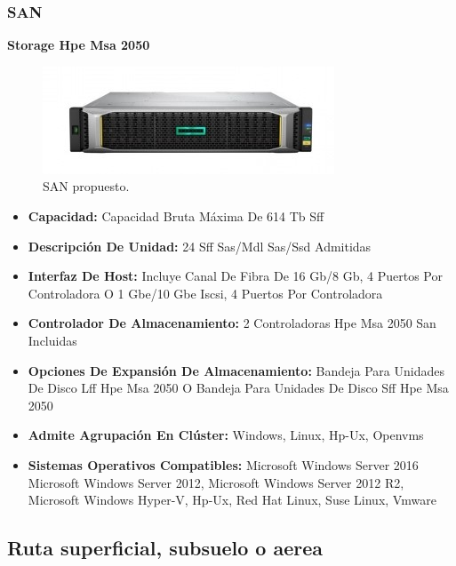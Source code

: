 \documentclass[12pt,letterpaper]{article}
\begin{document}
\newpage
\subsubsection{SAN}
\textbf{Storage Hpe Msa 2050}
\begin{figure}[ht]
    \centering
    \includegraphics[scale=.6]{imagenes/san.jpg}
    \caption{SAN propuesto.}
\end{figure}
\begin{itemize}
    \item \textbf{Capacidad: }Capacidad Bruta Máxima De 614 Tb Sff
    \item \textbf{Descripción De Unidad: }24 Sff Sas/Mdl Sas/Ssd Admitidas
    \item \textbf{Interfaz De Host: }Incluye Canal De Fibra De 16 Gb/8 Gb, 4 Puertos Por Controladora O 1 Gbe/10 Gbe Iscsi, 4 Puertos Por Controladora
    \item \textbf{Controlador De Almacenamiento: }2 Controladoras Hpe Msa 2050 San Incluidas
    \item \textbf{Opciones De Expansión De Almacenamiento: }Bandeja Para Unidades De Disco Lff Hpe Msa 2050 O Bandeja Para Unidades De Disco Sff Hpe Msa 2050
    \item \textbf{Admite Agrupación En Clúster: }Windows, Linux, Hp-Ux, Openvms
    \item \textbf{Sistemas Operativos Compatibles: }Microsoft Windows Server 2016 Microsoft Windows Server 2012, Microsoft Windows Server 2012 R2, Microsoft Windows Hyper-V, Hp-Ux, Red Hat Linux, Suse Linux, Vmware
\end{itemize}




\newpage
\subsection{Ruta superficial, subsuelo o aerea}

\newpage
\end{document}

